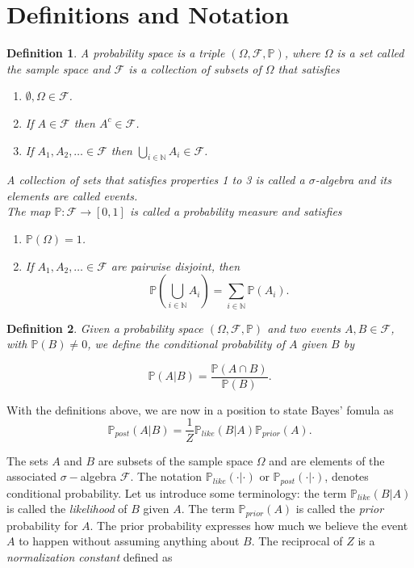 \documentclass{sfuthesis}
\newtheorem{definition}{Definition}
\newcommand{\post}{\mathbb{P}_{post}}
\newcommand{\like}{\mathbb{P}_{like}}
\newcommand{\prior}{\mathbb{P}_{prior}}
\newcommand{\p}{\mathbb{P}}
\begin{document}
\section{Definitions and Notation}
\begin{definition}\label{dfnprobabilitytriple}
A probability space is a triple $(\Omega,\mathscr{F},\p)$, where $\Omega$ is a set called 
the sample space and $\mathscr{F}$ is a collection of subsets of $\Omega$ that satisfies
\begin{enumerate}
\item $\emptyset,\Omega\in\mathscr{F}$.
\item If $A\in\mathscr{F}$ then $A^{c}\in\mathscr{F}$.
\item If $A_{1},A_{2},\ldots \in\mathscr{F}$ then $\bigcup_{i\in\mathbb{N}}A_{i}\in\mathscr{F}$.
\end{enumerate}
A  collection of sets that satisfies properties 1 to 3 is called a $\sigma$-algebra and its elements are called
events. 
\\
The map $\p:\mathscr{F}\rightarrow [0,1]$ is called a probability measure and satisfies
\begin{enumerate}
\item $\p(\Omega)=1$.
\item If $A_{1},A_{2},\ldots \in\mathscr{F}$ are pairwise disjoint, then 
\begin{equation*}
\p\left(\bigcup_{i\in\mathbb{N}}A_{i}\right)=\sum_{i\in\mathbb{N}}\p(A_{i}).
\end{equation*}
\end{enumerate}
\end{definition}

\begin{definition}
Given a probability space $(\Omega,\mathscr{F},\p)$ and two events $A,B\in\mathscr{F}$, with $\p(B)\neq 0$,
we define the conditional probability of $A$ given $B$ by

\begin{equation*}
\p(A|B)=\frac{\p(A\cap B)}{\p(B)}.
\end{equation*}
\end{definition}


With the definitions above, we are now in a position to state Bayes' fomula as
\begin{equation}\label{eqnBayes}
\post(A|B)=\frac{1}{Z}\like(B|A)\prior(A).
\end{equation}


The sets $A$ and $B$ are subsets of the sample space $\Omega$ and 
are elements of the associated $\sigma-$algebra $\mathscr{F}$. The  notation
 $\like(\cdot|\cdot)$ or $\post(\cdot|\cdot)$, denotes conditional probability. Let us introduce some terminology:
 the term $\like(B|A)$ is called the \textit{likelihood} of $B$ given $A$. The term $\prior(A)$ is called the 
\textit{prior} probability for $A$. The prior probability expresses how much we believe the event $A$ 
to happen without assuming
anything about  $B$. The reciprocal of $Z$ is a \textit{normalization constant} defined as 
\end{document}
